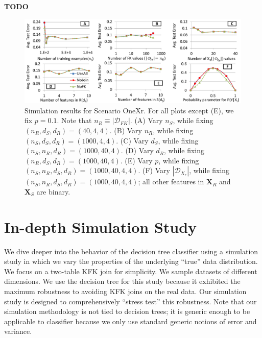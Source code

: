 \documentclass{vldb}
\begin{document}
\textbf{TODO}

\begin{figure}[t]
\centering
\includegraphics[width=0.85\linewidth]{onexr.pdf}
\caption{Simulation results for Scenario OneXr. For all plots except (E), we fix $p = 0.1$. Note that $n_R \equiv |\mathcal{D}_{FK}|$.
(A) Vary $n_S$, while fixing $(n_R, d_S, d_R) = (40, 4, 4)$.
(B) Vary $n_R$, while fixing $(n_S, d_S, d_R) = (1000, 4, 4)$.
(C) Vary $d_S$, while fixing $(n_S, n_R, d_R) = (1000, 40, 4)$.
(D) Vary $d_R$, while fixing $(n_R, d_S, d_R) = (1000, 40, 4)$.
(E) Vary $p$,  while fixing $(n_S, n_R, d_S, d_R) = (1000, 40, 4, 4)$.
(F) Vary $|\mathcal{D}_{X_r}|$, while fixing $(n_S, n_R, d_S, d_R) = (1000, 40, 4, 4)$; all other features in $\textbf{X}_R$ and $\textbf{X}_S$ are binary.
}
\label{Figure:OneXrSimulation}
\end{figure}

\section{In-depth Simulation Study}	

We dive deeper into the behavior of the decision tree classifier using a simulation study in which we vary the properties of the 
underlying ``true'' data distribution. We focus on a two-table KFK join for simplicity. We sample datasets of different dimensions.
We use the decision tree for this study because it exhibited the maximum robustness to avoiding KFK joins on the real data. 
Our simulation study is designed to comprehensively ``stress test'' this robustness.
Note that our simulation methodology is not tied to decision trees; it is generic enough to be applicable to classifier because we only 
use standard generic notions of error and variance.
\end{document}
